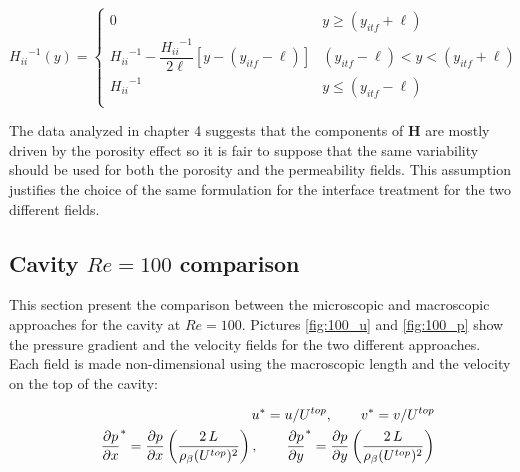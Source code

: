 \begin{equation}
{H_{ii}}^{-1}(y) = 
\begin{cases}
0 & y\geqslant(y_{itf}+\ell) \\
{H_{ii}}^{-1} - \dfrac{{H_{ii}}^{-1}}{2\ell}\left[y -\left(y_{itf} -\ell\right)\right] &  (y_{itf}-\ell)<y<(y_{itf}+\ell)\\
{H_{ii}}^{-1} &y\leqslant(y_{itf}-\ell) \\
\end{cases}
\label{eq:permeability_fun}
\end{equation}

The data analyzed in chapter 4 suggests that the components of $\mathbf{H}$ are mostly driven by the porosity effect so it is fair to suppose that the same variability should be used for both the porosity and the permeability fields. This assumption justifies the choice of the same formulation for the interface treatment for the two different fields.

\subsection{Cavity $Re=100$ comparison}

This section present the comparison between the microscopic and macroscopic approaches for the cavity at $Re=100$. Pictures \ref{fig:100_u} and \ref{fig:100_p} show the pressure gradient and the velocity fields for the two different approaches.
Each field is made non-dimensional using the macroscopic length and the velocity on the top of the cavity:

\begin{eqnarray}
&& u^* = u/{U^{top}}, \qquad v^* = v/{U^{top}} \nonumber \\
&& \dfrac{\partial p}{\partial x}^* = \dfrac{\partial p}{\partial x}  \left(\dfrac{2 \, L}{ \rho_{\beta} {(U^{top})^2 }}   \right), \qquad \dfrac{\partial p}{\partial y}^* = \dfrac{\partial p}{\partial y}  \left(\dfrac{2 \, L}{ \rho_{\beta} {(U^{top})^2 }}   \right) \nonumber
\end{eqnarray}


